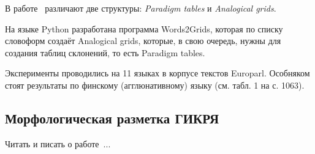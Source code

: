 В работе~\cite{Fam2018tools} различают две структуры: \emph{Paradigm tables} 
и \emph{Analogical grids}. 

На языке Python разработана программа Words2Grids, которая по списку словоформ 
создаёт Analogical grids, которые, в свою очередь, нужны для создания 
таблиц склонений, то есть Paradigm tables.

Эксперименты проводились на 11 языках в корпусе текстов Europarl. 
Особняком стоят результаты по финскому (агглюнативному) языку (см. табл. 1 на с. 1063).


\subsection{Морфологическая разметка ГИКРЯ}

Читать и писать о работе~\cite{Selegey2016}...
